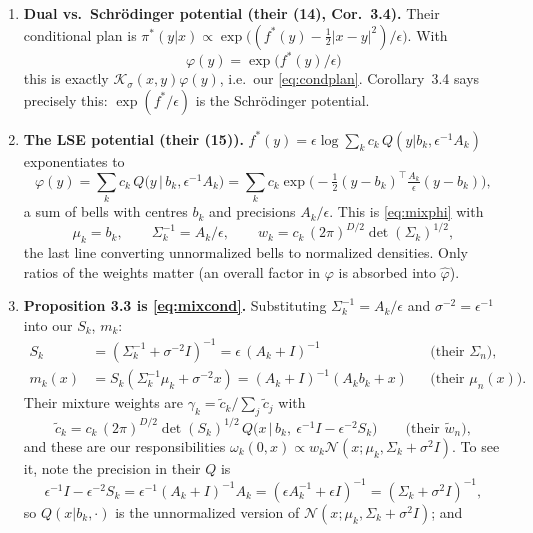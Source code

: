 \documentclass[11pt]{article}
\newcommand{\Nc}{\mathcal{N}}
\newcommand{\Kc}{\mathcal{K}}
\newcommand{\hphi}{\hat\varphi}
\theoremstyle{definition}
\theoremstyle{plain}
\begin{document}
\begin{enumerate}
  \item \textbf{Dual vs.\ Schr\"odinger potential (their (14), Cor.\ 3.4).} Their conditional
        plan is $\pi^*(y|x)\propto\exp\big((f^*(y)-\tfrac12|x-y|^2)/\epsilon\big)$. With
        \[
          \varphi(y)=\exp\big(f^*(y)/\epsilon\big)
        \]
        this is exactly $\Kc_\sigma(x,y)\varphi(y)$, i.e.\ our \eqref{eq:condplan}. Corollary~3.4
        says precisely this: $\exp(f^*/\epsilon)$ is the Schr\"odinger potential.
  \item \textbf{The LSE potential (their (15)).}
        $f^*(y)=\epsilon\log\sum_kc_k\,Q(y|b_k,\epsilon^{-1}A_k)$ exponentiates to
        \[
          \varphi(y)=\sum_kc_k\,Q\big(y\,|\,b_k,\epsilon^{-1}A_k\big)
                   =\sum_kc_k\exp\!\Big(-\tfrac12(y-b_k)^{\!\top}\tfrac{A_k}{\epsilon}(y-b_k)\Big),
        \]
        a sum of bells with centres $b_k$ and precisions $A_k/\epsilon$. This is \eqref{eq:mixphi}
        with
        \[
          \mu_k=b_k,\qquad \Sigma_k^{-1}=A_k/\epsilon,\qquad
          w_k=c_k\,(2\pi)^{D/2}\det(\Sigma_k)^{1/2},
        \]
        the last line converting unnormalized bells to normalized densities. Only ratios of the
        weights matter (an overall factor in $\varphi$ is absorbed into $\hphi$).
  \item \textbf{Proposition 3.3 is \eqref{eq:mixcond}.} Substituting $\Sigma_k^{-1}=A_k/\epsilon$
        and $\sigma^{-2}=\epsilon^{-1}$ into our $S_k$, $m_k$:
        \begin{align*}
          S_k&=(\Sigma_k^{-1}+\sigma^{-2}I)^{-1}=\epsilon\,(A_k+I)^{-1}
            &&\text{(their $\Sigma_n$)},\\
          m_k(x)&=S_k(\Sigma_k^{-1}\mu_k+\sigma^{-2}x)=(A_k+I)^{-1}(A_kb_k+x)
            &&\text{(their $\mu_n(x)$)}.
        \end{align*}
        Their mixture weights are $\gamma_k=\tilde c_k/\sum_j\tilde c_j$ with
        \[
          \tilde c_k=c_k\,(2\pi)^{D/2}\det(S_k)^{1/2}\,Q\big(x\,|\,b_k,\ \epsilon^{-1}I-\epsilon^{-2}S_k\big)
          \qquad\text{(their $\tilde w_n$)},
        \]
        and these are our responsibilities $\omega_k(0,x)\propto w_k\Nc(x;\mu_k,\Sigma_k+\sigma^2I)$.
        To see it, note the precision in their $Q$ is
        \[
          \epsilon^{-1}I-\epsilon^{-2}S_k=\epsilon^{-1}(A_k+I)^{-1}A_k
          =(\epsilon A_k^{-1}+\epsilon I)^{-1}=(\Sigma_k+\sigma^2I)^{-1},
        \]
        so $Q(x|b_k,\cdot)$ is the unnormalized version of $\Nc(x;\mu_k,\Sigma_k+\sigma^2I)$; and
        \[
\]
\end{enumerate}
\end{document}
